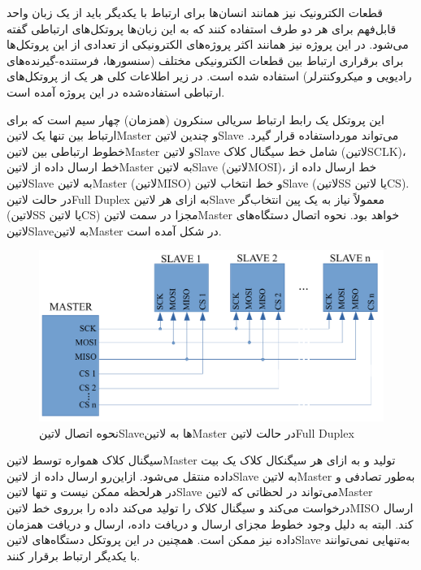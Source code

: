 قطعات الکترونیک نیز همانند انسان‌ها برای ارتباط با یکدیگر باید از یک زبان واحد قابل‌فهم برای هر دو طرف استفاده کنند که به این زبان‌ها پروتکل‌های ارتباطی گفته می‌شود. در این پروژه نیز همانند اکثر پروژه‌های الکترونیکی از تعدادی از این پروتکل‌ها برای برقراری ارتباط بین قطعات الکترونیکی مختلف (سنسورها، فرستنده-گیرنده‌های رادیویی و میکروکنترلر) استفاده شده است. در زیر اطلاعات کلی هر یک از پروتکل‌های ارتباطی استفاده‌شده در این پروژه آمده است.


این پروتکل یک رابط ارتباط سریالی سنکرون (همزمان) چهار سیم است که برای ارتباط بین تنها یک ‌لاتین{Master} و چندین ‌لاتین{Slave} می‌تواند مورداستفاده قرار گیرد. خطوط ارتباطی بین ‌لاتین{Master} و ‌لاتین{Slave} شامل خط سیگنال کلاک (‌لاتین{SCLK})، خط ارسال داده از ‌لاتین{Master} به ‌لاتین{Slave} (‌لاتین{MOSI})، خط ارسال داده از ‌لاتین{Slave} به ‌لاتین{Master} (‌لاتین{MISO}) و خط انتخاب ‌لاتین{Slave} (‌لاتین{SS} یا ‌لاتین{CS}). در حالت ‌لاتین{Full Duplex} به ازای هر ‌لاتین{Slave} معمولاً نیاز به یک پین انتخاب‌گر (‌لاتین{SS} یا ‌لاتین{CS}) مجزا در سمت ‌لاتین{Master} خواهد بود. نحوه اتصال دستگاه‌های ‌لاتین{Slave}به ‌لاتین{Master} در شکل  آمده است. 

\begin{figure}[!h]
	\centering
	\includegraphics[width=.7\linewidth]{Assets/SPI.pdf}
	\caption{نحوه اتصال ‌لاتین{Slave}ها به ‌لاتین{Master} در حالت ‌لاتین{Full Duplex} }
	\label{fig:SPIWiring}
\end{figure}

سیگنال کلاک همواره توسط ‌لاتین{Master} تولید و به ازای هر سیگنکال کلاک یک بیت داده منتقل می‌شود. ازاین‌رو ارسال داده از ‌لاتین{Slave} به ‌لاتین{Master} به‌طور تصادفی و در هرلحظه ممکن نیست و تنها ‌لاتین{Slave} می‌تواند در لحظاتی که ‌لاتین{Master} درخواست می‌کند و سیگنال کلاک را تولید می‌کند داده را برروی خط ‌لاتین{MISO} ارسال کند. البته به دلیل وجود خطوط مجزای ارسال و دریافت داده، ارسال و دریافت همزمان داده نیز ممکن است. همچنین در این پروتکل دستگاه‌های ‌لاتین{Slave} به‌تنهایی نمی‌توانند با یکدیگر ارتباط برقرار کنند.

